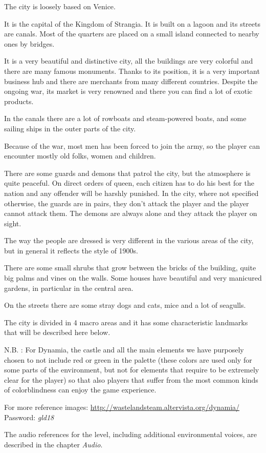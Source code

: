 The city is loosely based on Venice.

It is the capital of the Kingdom of Strangia. It is built on a lagoon and its streets are canals. Most of the quarters are placed on a small island connected to nearby ones by bridges.

It is a very beautiful and distinctive city, all the buildings are very colorful and there are many famous monuments. Thanks to its position, it is a very important business hub and there are merchants from many different countries. Despite the ongoing war, its market is very renowned and there you can find a lot of exotic products.

In the canals there are a lot of rowboats and steam-powered boats, and some sailing ships in the outer parts of the city.

Because of the war, most men has been forced to join the army, so the player can encounter mostly old folks, women and children.

There are some guards and demons that patrol the city, but the atmosphere is quite peaceful. On direct orders of queen, each citizen has to do his best for the nation and any offender will be harshly punished. In the city, where not specified otherwise, the guards are in pairs, they don't attack the player and the player cannot attack them. The demons are always alone and they attack the player on sight.

The way the people are dressed is very different in the various areas of the city, but in general it reflects the style of 1900s.

There are some small shrubs that grow between the bricks of the building, quite big palms and vines on the walls. Some houses have beautiful and very manicured gardens, in particular in the central area.

On the streets there are some stray dogs and cats, mice and a lot of seagulls.

The city is divided in 4 macro areas and it has some characteristic landmarks that will be described here below.

N.B. : For Dynamia, the castle and all the main elements we have purposely chosen to not include red or green in the palette (these colors are used only for some parts of the environment, but not for elements that require to be extremely clear for the player) so that also players that suffer from the most common kinds of colorblindness can enjoy the game experience.

For more reference images: \url{http://wastelandsteam.altervista.org/dynamia/}\\
Password: \textit{gld18}

The audio references for the level, including additional environmental voices, are described in the chapter \textit{Audio}.

